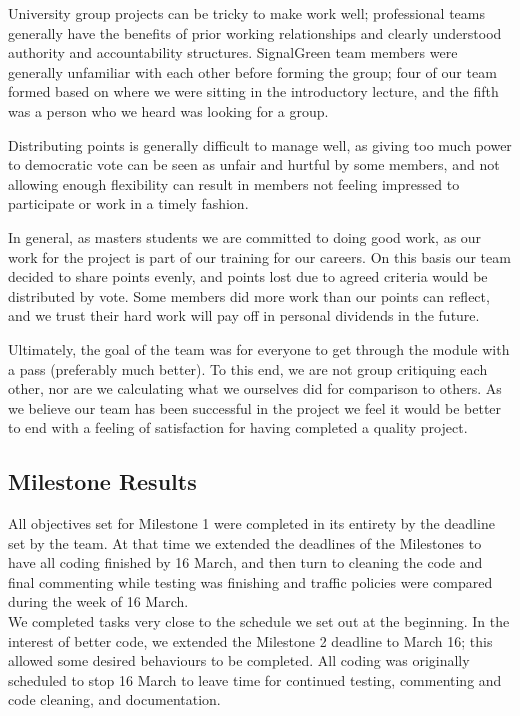 \documentclass[11pt]{article}
\begin{document}
\begin{enumerate}
University group projects can be tricky to make work well; professional teams generally have the benefits of prior working relationships and clearly understood authority and accountability structures. SignalGreen team members were generally unfamiliar with each other before forming the group; four of our team formed based on where we were sitting in the introductory lecture, and the fifth was a person who we heard was looking for a group. 

Distributing points is generally difficult to manage well, as giving too much power to democratic vote can be seen as unfair and hurtful by some members, and not allowing enough flexibility can result in members not feeling impressed to participate or work in a timely fashion. 

In general, as masters students we are committed to doing good work, as our work for the project is part of our training for our careers. On this basis our team decided to share points evenly, and points lost due to agreed criteria would be distributed by vote. Some members did more work than our points can reflect, and we trust their hard work will pay off in personal dividends in the future.

Ultimately, the goal of the team was for everyone to get through the module with a pass (preferably much better). To this end, we are not group critiquing each other, nor are we calculating what we ourselves did for comparison to others. As we believe our team has been successful in the project we feel it would be better to end with a feeling of satisfaction for having completed a quality project.


\subsection{Milestone Results}

All objectives set for Milestone 1 were completed in its entirety by the deadline set by the team. At that time we extended the deadlines of the Milestones to have all coding finished by 16 March, and then turn to cleaning the code and final commenting while testing was finishing and traffic policies were compared during the week of 16 March.
\\
We completed tasks very close to the schedule we set out at the beginning. In the interest of better code, we extended the Milestone 2 deadline to March 16; this allowed some desired behaviours to be completed. All coding was originally scheduled to stop 16 March to leave time for continued testing, commenting and code cleaning, and documentation. 


\end{enumerate}
\end{document}
